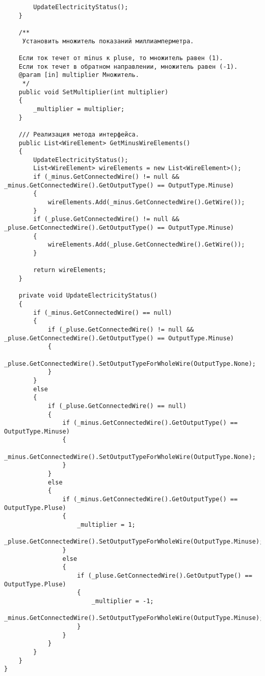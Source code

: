 \begin{verbatim}
        UpdateElectricityStatus();
    }

    /**
     Установить множитель показаний миллиамперметра.

    Если ток течет от minus к pluse, то множитель равен (1).
    Если ток течет в обратном направлении, множитель равен (-1).
    @param [in] multiplier Множитель.
     */
    public void SetMultiplier(int multiplier)
    {
        _multiplier = multiplier;
    }

    /// Реализация метода интерфейса.
    public List<WireElement> GetMinusWireElements()
    {
        UpdateElectricityStatus();
        List<WireElement> wireElements = new List<WireElement>();
        if (_minus.GetConnectedWire() != null && _minus.GetConnectedWire().GetOutputType() == OutputType.Minuse)
        {
            wireElements.Add(_minus.GetConnectedWire().GetWire());
        }
        if (_pluse.GetConnectedWire() != null && _pluse.GetConnectedWire().GetOutputType() == OutputType.Minuse)
        {
            wireElements.Add(_pluse.GetConnectedWire().GetWire());
        }

        return wireElements;
    }

    private void UpdateElectricityStatus()
    {
        if (_minus.GetConnectedWire() == null)
        {
            if (_pluse.GetConnectedWire() != null && _pluse.GetConnectedWire().GetOutputType() == OutputType.Minuse)
            {
                _pluse.GetConnectedWire().SetOutputTypeForWholeWire(OutputType.None);
            }
        }
        else
        {
            if (_pluse.GetConnectedWire() == null)
            {
                if (_minus.GetConnectedWire().GetOutputType() == OutputType.Minuse)
                {
                    _minus.GetConnectedWire().SetOutputTypeForWholeWire(OutputType.None);
                }
            }
            else
            {
                if (_minus.GetConnectedWire().GetOutputType() == OutputType.Pluse)
                {
                    _multiplier = 1;
                    _pluse.GetConnectedWire().SetOutputTypeForWholeWire(OutputType.Minuse);
                }
                else
                {
                    if (_pluse.GetConnectedWire().GetOutputType() == OutputType.Pluse)
                    {
                        _multiplier = -1;
                        _minus.GetConnectedWire().SetOutputTypeForWholeWire(OutputType.Minuse);
                    }
                }
            }
        }
    }
}

\end{verbatim}
